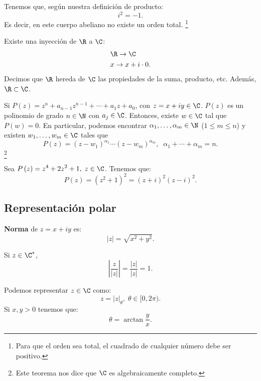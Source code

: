 \begin{observation}
\normalfont Tenemos que, según nuestra definición de producto:
\[i^{2} = -1 .\]
Es decir, en este cuerpo abeliano no existe un orden total. \footnote{Para que el orden sea total, el cuadrado de cualquier número debe ser positivo.} 
\end{observation}
\begin{observation}
\normalfont Existe una inyección de $\displaystyle \R $ a $\displaystyle \C $:
\[
\begin{split}
& \R \to \C \\
& x \to x + i \cdot 0.
\end{split}
\]
Decimos que $\displaystyle \R $ hereda de $\displaystyle \C $ las propiedades de la suma, producto, etc. Además, $\displaystyle \R \subset \C $.
\end{observation}

\begin{ftheorem}
\normalfont Si $\displaystyle P\left(z\right) = z^{n} + a_{n-1}z^{n-1}+\cdots +a_{1}z + a_{0} $, con $\displaystyle z = x + iy \in \C $. $\displaystyle P\left(z\right) $ es un polinomio de grado $\displaystyle n  \in \N$ con $\displaystyle a_{j}\in \C $. Entonces, existe $\displaystyle w \in \C $ tal que $\displaystyle P\left(w\right) = 0 $. En particular, podemos encontrar $\displaystyle \alpha_{1}, \ldots, \alpha_{m}\in \N $ ($\displaystyle 1 \leq m \leq n $) y existen $\displaystyle w_{1}, \ldots, w_{m}\in \C $ tales que 
\[P\left(z\right) = \left(z-w_{1}\right)^{\alpha_{1}} \cdots \left(z-w_{m}\right)^{\alpha_{m}}, \;\; \alpha_{1} + \cdots + \alpha_{m} = n.\]
\footnote{Este teorema nos dice que $\displaystyle \C $ es algebraicamente completo.} 
\end{ftheorem}

\begin{eg}
\normalfont Sea $\displaystyle P\left(z\right) = z^{4} + 2z^{2} +1, \; z\in \C $. Tenemos que:
\[P\left(z\right) = \left(z^{2} + 1\right)^{2} = \left(z+i\right)^{2}\left(z-i\right)^{2} .\]
\end{eg}

\subsection{Representación polar}

\begin{fdefinition}[]
\normalfont \textbf{Norma} de $\displaystyle z = x + iy $ es:
\[ \left|z\right| = \sqrt{x^{2}+y^{2}} .\]
\end{fdefinition}

\begin{ftheorem}[]
\normalfont Si $\displaystyle z \in \C^{*} $, 
\[ \left| \frac{z}{ \left|z\right|}\right| = \frac{ \left|z\right|}{ \left|z\right|} = 1 .\]
\end{ftheorem}

\begin{fdefinition}[]
\normalfont Podemos representar $\displaystyle z \in \C $ como:
\[z = \left|z\right|_{\theta}, \; \theta \in [0,2\pi) .\]
Si $\displaystyle x,y > 0 $ tenemos que:
\[\theta = \arctan\frac{y}{x} .\]
\end{fdefinition}

